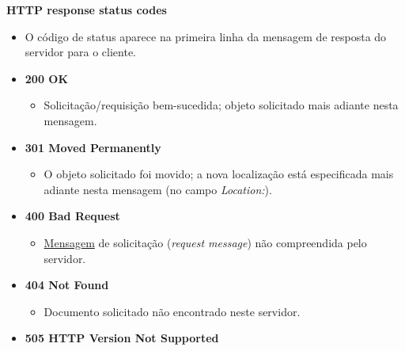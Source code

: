     \textbf{HTTP response status codes}
    \begin{itemize}[left=0.5cm, align=left, nosep]    
        \item O código de status aparece na primeira linha da mensagem de resposta do servidor para o cliente.
        \item \textbf{200 OK}
        \begin{itemize}[left=0.5cm, nosep, label=$\hookrightarrow$]
            \item Solicitação/requisição bem-sucedida; objeto solicitado mais adiante nesta mensagem.
        \end{itemize}
        \item \textbf{301 Moved Permanently}
        \begin{itemize}[left=0.5cm, nosep, label=$\hookrightarrow$]
            \item O objeto solicitado foi movido; a nova localização está especificada mais adiante nesta mensagem (no campo \textit{Location:}).
        \end{itemize}
        \item \textbf{400 Bad Request}
        \begin{itemize}[left=0.5cm, nosep, label=$\hookrightarrow$]
            \item \underline{Mensagem} de solicitação (\textit{request message}) não compreendida pelo servidor.
        \end{itemize}
        \item \textbf{404 Not Found}
        \begin{itemize}[left=0.5cm, nosep, label=$\hookrightarrow$]
            \item Documento solicitado não encontrado neste servidor.
        \end{itemize}
        \item \textbf{505 HTTP Version Not Supported}
    \end{itemize}

